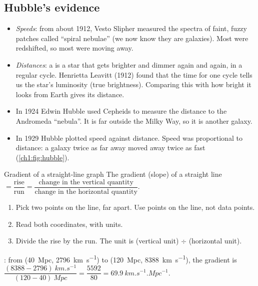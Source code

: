 \subsection{Hubble's evidence}
\begin{itemize}
  \item \emph{Speeds}: from about 1912, Vesto Slipher measured the spectra of faint,
        fuzzy patches called ``spiral nebulae'' (we now know they are galaxies). Most
        were redshifted, so most were moving away.
  \item \emph{Distances}: a  is a star that gets brighter and
        dimmer again and again, in a regular cycle. Henrietta Leavitt (1912) found that
        the time for one cycle tells us the star's luminosity (true brightness).
        Comparing this with how bright it looks from Earth gives its distance.
  \item In 1924 Edwin Hubble used Cepheids to measure the distance to the Andromeda
        ``nebula''. It is far outside the Milky Way, so it is another galaxy.
  \item In 1929 Hubble plotted speed against distance. Speed was proportional to
        distance: a galaxy twice as far away moved away twice as fast
        (\cref{ch1:fig:hubble}).
\end{itemize}

\begin{toolkit}{Gradient of a straight-line graph}
The gradient (slope) of a straight line $= \dfrac{\text{rise}}{\text{run}}
= \dfrac{\text{change in the vertical quantity}}{\text{change in the horizontal quantity}}$.
\begin{enumerate}
  \item Pick two points on the line, far apart. Use points on the line, not data points.
  \item Read both coordinates, with units.
  \item Divide the rise by the run. The unit is (vertical unit) $\div$ (horizontal unit).
\end{enumerate}
: from (\qty{40}{Mpc}, \qty{2796}{km.s^{-1}}) to
(\qty{120}{Mpc}, \qty{8388}{km.s^{-1}}), the gradient is
$\dfrac{(8388 - 2796)\ \si{km.s^{-1}}}{(120 - 40)\ \si{Mpc}} = \dfrac{5592}{80}
= \qty{69.9}{km.s^{-1}.Mpc^{-1}}$.
\end{toolkit}

